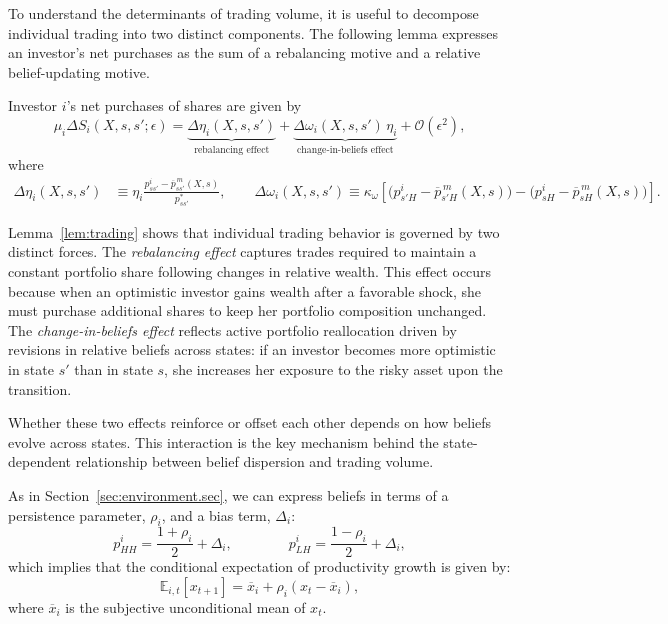 {To understand the determinants of trading volume, it is useful to decompose individual
trading into two distinct components. The following lemma expresses an investor's net purchases as the sum of a rebalancing motive
and a relative belief-updating motive.

\begin{lemma}\label{lem:trading}
Investor $i$'s net purchases of shares are given by
\begin{equation}\label{eq:trading}
    \mu_i \Delta S_i(X,s,s';\epsilon)
    =
    \underbrace{\Delta \eta_i(X,s,s')}_{\text{rebalancing effect}}
    +
    \underbrace{\Delta \omega_i(X,s,s')\,\eta_i}_{\text{change-in-beliefs effect}}
    + \mathcal{O}(\epsilon^2),
\end{equation}
where\small
\begin{align}
    \Delta \eta_i(X,s,s') &\equiv \eta_i \frac{p_{ss'}^i-\overline{p}^{\,m}_{ss'}(X,s)}{p_{ss'}^*},
    \qquad
    \Delta \omega_i(X,s,s') \equiv \kappa_\omega\!\left[
        \big(p_{s'H}^i-\overline{p}^{\,m}_{s'H}(X,s)\big)
        -\big(p_{sH}^i-\overline{p}^{\,m}_{sH}(X,s)\big)
    \right].
    \nonumber
\end{align}\normalsize
\end{lemma}

Lemma~\ref{lem:trading} shows that individual trading behavior is governed by two distinct forces.
The \emph{rebalancing effect} captures trades required to maintain a constant portfolio share
following changes in relative wealth. This effect occurs because when an optimistic investor gains wealth
after a favorable shock, she must purchase additional shares to keep her portfolio composition unchanged.
The \emph{change-in-beliefs effect} reflects active portfolio reallocation driven by revisions in
relative beliefs across states: if an investor becomes more optimistic in state $s'$ than in state $s$,
she increases her exposure to the risky asset upon the transition.

Whether these two effects reinforce or offset each other depends on how beliefs evolve across states.
This interaction is the key mechanism behind the state-dependent relationship between belief dispersion
and trading volume.


 As in Section~\ref{sec:environment.sec}, we can express beliefs in terms of a persistence parameter, $\rho_i$, and a bias term, $\Delta_i$:
\begin{equation}\label{eq: beliefs_persistence_bias}
    p_{HH}^i = \frac{1+\rho_i}{2} + \Delta_i, \qquad \qquad p_{LH}^i = \frac{1-\rho_i}{2} + \Delta_i,\nonumber
\end{equation}
which implies that the conditional expectation of productivity growth is given by:
\begin{equation}\label{eq: conditional_expectation}
    \mathbb{E}_{i,t}[x_{t+1}] = \overline{x}_i + \rho_i (x_t - \overline{x}_i),
\end{equation}
where $\overline{x}_i$ is the subjective unconditional mean of $x_t$.

}
